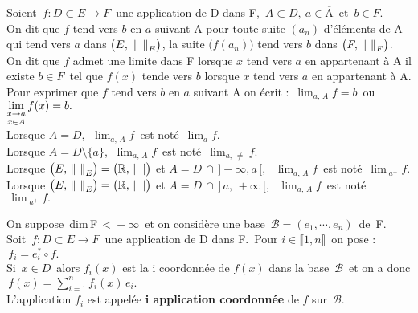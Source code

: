 Soient \(\,f:D\subset E\to F\,\) une application de D dans F, \(\,A\subset D,\ a\in \overline{\text{A}}\,\text{ et } \,b\in F.\)\vspace{0.1cm}\\
On dit que $f$ tend vers $b$ en $a$ suivant A \ssi pour toute suite $(a_n)$ d'éléments de A qui tend vers $a$ dans \(\bigl(E,\ \left\lVert\ \right\rVert_E\bigr)\), la suite \(\bigl(f(a_n)\bigr)\) tend vers $b$ dans \(\bigl(F,\, \norm{\ }_F\bigr)\).\vspace{0.2cm}\\
On dit que $f$ admet une limite dans F lorsque $x$ tend vers $a$ en appartenant à A \ssi il existe $b\in F\,$ tel que $f(x)$ tende vers $b$ lorsque $x$ tend vers $a$ en appartenant à A.\vspace{0.2cm}\\
Pour exprimer que $f$ tend vers $b$ en $a$ suivant A on écrit : \(\,\displaystyle \lim_{a,\,A}f=b\,\) ou \( \displaystyle \lim_{\substack{\vspace{-0.05cm} \\ x\to a\vspace{0.05cm}\\ x\in A}} f(x)=b.\)\vspace{-0.1cm}\\
Lorsque $A=D$, \(\displaystyle \; \lim_{a,\,A}f\,\) est noté \(\,\displaystyle \lim_af.\)\vspace{0.15cm}\\
Lorsque $A=D\!\setminus\!\{a\}$, \(\ \displaystyle \lim_{a,\,A}f\,\) est noté \(\,\displaystyle \lim_{a,\, \neq}f.\)\vspace{0.15cm}\\
Lorsque \(\bigl(E,\, \norm{\ }_E\bigr)=\bigl(\RR,\, \mid\ \; \mid\bigr)\) et \(A=D\,\cap\,]-\infty,a\,[\), \(\ \displaystyle \; \lim_{a,\,A}f\,\) est noté \(\,\displaystyle \lim_{\;a^-}f.\)\vspace{0.15cm}\\
Lorsque \(\bigl(E,\, \norm{\ }_E\bigr)=\bigl(\RR,\, \mid\ \; \mid\bigr)\) et \(A=D\,\cap\,]\,a,\,+\infty\,[\), \(\ \displaystyle \; \lim_{a,\,A}f\,\) est noté \(\,\displaystyle \lim_{\;a^+}f.\)

\vspace{1.3cm}

On suppose\, dim\,F\(\,<\!+\infty\,\) et on considère une base \(\,\mathcal{B}=(e_1,\cdots,e_n)\,\) de\, F.\vspace{0.1cm}\\
Soit \(\,f:D\subset E\to F\,\) une application de D dans F. \,Pour \(i\in \llbracket 1,n \rrbracket\,\) on pose : \(\,f_i=e_i^*\circ f.\)\vspace{0.1cm}\\
Si \(\,x\in D\,\) alors $f_i(x)$ est la i coordonnée de $f(x)$ dans la base $\,\mathcal{B}\,$ et on a donc \(\,\displaystyle f(x)=\sum_{i=1}^{n}f_i(x)\,e_i.\)\vspace{(-0.2cm)}\\
L'application $f_i$ est appelée \textbf{i application coordonnée} de $f$ sur $\,\mathcal{B}.$

